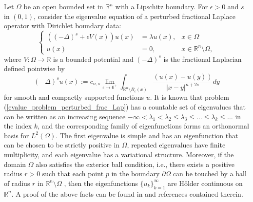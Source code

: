 \documentclass[preprint,12pt]{elsarticle}
\newcommand{\R}{\mathbb R}
\begin{document}
Let $\Omega$ be an open bounded set in $\R^n$ with a Lipschitz boundary. For $\epsilon>0$ and $s$ in $(0,1)$, consider the eigenvalue equation of a perturbed fractional Laplace operator with Dirichlet boundary data:
\begin{equation}\label{evalue_problem_perturbed_frac_Lap}
 \left\{\begin{aligned}
        ((-\Delta)^s+\epsilon V(x))u(x)&=\lambda u(x), &x\in\Omega\\
        u(x)&=0, &x\in\R^n\setminus \Omega,
       \end{aligned}
 \right.
\end{equation}
where $V:\Omega\to\R$ is a bounded potential and $(-\Delta)^s$ is the fractional Laplacian defined pointwise by
\[
(-\Delta)^su(x):=c_{n,s}\lim_{\epsilon\to 0^+}\int_{\R^n\setminus B_\epsilon(x)}\frac{(u(x)-u(y))}{\left|x-y\right|^{n+2s}}dy
\]
for smooth and compactly supported functions $u$. It is known that problem (\ref{evalue_problem_perturbed_frac_Lap}) has a countable set of eigenvalues that can be written as an increasing sequence $-\infty<\lambda_1<\lambda_2\leq\lambda_3\leq\dots\leq\lambda_k\leq\dots$ in the index $k$, and the corresponding family of eigenfunctions 
forms an orthonormal basis for $L^2(\Omega)$. The first eigenvalue is simple and has an eigenfunction that can be chosen to be strictly positive in $\Omega$, 
repeated eigenvalues have finite multiplicity, and each eigenvalue has a variational structure. Moreover, if the domain $\Omega$ also satisfies the exterior ball condition, i.e., there exists a positive radius $r>0$ such that each point $p$ in the boundary $\partial\Omega$ can be touched by a ball of radius $r$ in $\R^n\setminus\Omega$ \cite{ROS},  then the eigenfunctions $\{u_k\}_{k=1}^\infty$ are H\"{o}lder continuous on $\R^n$. A proof of the above facts can be found in \cite{Zh} and references contained therein.
\end{document}
